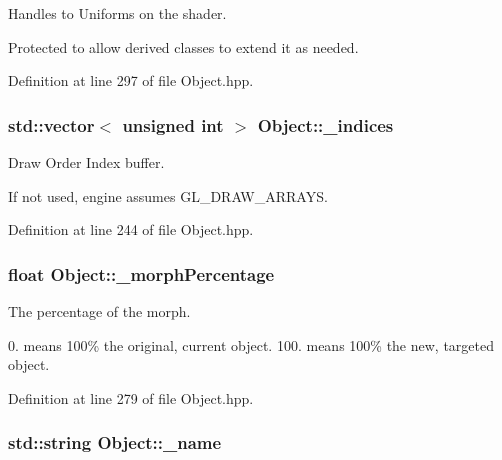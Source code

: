 Handles to Uniforms on the shader. 

Protected to allow derived classes to extend it as needed. 

Definition at line 297 of file Object.\-hpp.

\hypertarget{class_object_ab85adc7a2d3b891051c096593982653d}{
\subsubsection[{\-\_\-indices}]{\setlength{\rightskip}{0pt plus 5cm}std\-::vector$<$ unsigned int $>$ Object\-::\-\_\-indices}}\label{class_object_ab85adc7a2d3b891051c096593982653d}


Draw Order Index buffer. 

If not used, engine assumes G\-L\-\_\-\-D\-R\-A\-W\-\_\-\-A\-R\-R\-A\-Y\-S. 

Definition at line 244 of file Object.\-hpp.

\hypertarget{class_object_a7fbbac9027e1a8266342bd5ce064120d}{
\subsubsection[{\-\_\-morph\-Percentage}]{\setlength{\rightskip}{0pt plus 5cm}float Object\-::\-\_\-morph\-Percentage\hspace{0.3cm}{\ttfamily [protected]}}}\label{class_object_a7fbbac9027e1a8266342bd5ce064120d}


The percentage of the morph. 

0. means 100\% the original, current object. 100. means 100\% the new, targeted object. 

Definition at line 279 of file Object.\-hpp.

\hypertarget{class_object_a3f617214b260ebbe394e7c7b08ab5e43}{
\subsubsection[{\-\_\-name}]{\setlength{\rightskip}{0pt plus 5cm}std\-::string Object\-::\-\_\-name\hspace{0.3cm}{\ttfamily [protected]}}}\label{class_object_a3f617214b260ebbe394e7c7b08ab5e43}


